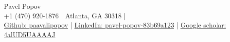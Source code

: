 \documentclass[11pt,a4paper]{article}
\begin{document}
\begin{center}
  {\Huge Pavel Popov}\\[0.5em]
  {\footnotesize +1 (470) 920-1876 \quad | \quad Atlanta, GA 30318} \quad | \\
  {\small \href{https://github.com/paavalipopov}{Github: paavalipopov} \quad | \quad
  \href{https://www.linkedin.com/in/pavel-popov-83b69a123/}{LinkedIn: pavel-popov-83b69a123} \quad | \quad
  \href{https://scholar.google.com/citations?user=4alUD5UAAAAJ}{Google scholar: 4alUD5UAAAAJ}}
\end{center}
\end{document}
